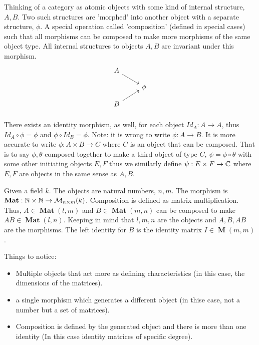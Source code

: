 \documentclass[12pt,a4paper]{report}
\newcommand{\CATSET}[1]{\operatorname{\textbf{#1}}}
\begin{document}
Thinking of a category as atomic objects with some kind of internal structure, $A,B$.  Two such structures are 'morphed' into another object with a separate structure, $\phi$.  A special operation called 'composition' (defined in special cases) such that all morphisms can be composed to make more morphisms of the same object type.  All internal structures to objects $A,B$ are invariant under this morphism.  
\[
	\begin{tikzcd}[row sep=small]
		A \arrow[rd]\\
		& \phi \\
		B \arrow[ru]\\
	\end{tikzcd}
\]There exists an identity morphism, as well, for each object $Id_A : A \to A$, thus $Id_A \circ \phi = \phi$ and $\phi \circ Id_B = \phi$.  Note: it is wrong to write $\phi : A \to B$.  It is more accurate to write $\phi : A \times B \to C$ where $C$ is an object that can be composed.  That is to say $\phi, \theta$ composed together to make a third object of type $C$, $\psi =\phi \circ \theta$ with some other initiating objects $E,F$ thus we similarly define $\psi: E \times F \to \mathbb{C}$ where $E,F$ are objects in the same sense as $A,B$.\\
\HLINE
\begin{example}

Given a field $k$.  The objects are natural numbers, $n,m$.  The morphism is $\CATSET{Mat}: \N \times \N \to \mathcal{M}_{n\times m}(k)$.  Composition is defined as matrix multiplication.  Thus, $A\in\CATSET{Mat}(l,m)$ and $B\in\CATSET{Mat}(m,n)$ can be composed to make $AB\in\CATSET{Mat}(l,n)$.  Keeping in mind that $l,m,n$ are the objects and $A,B, AB$ are the morphisms.  The left identity for $B$ is the identity matrix $I\in\CATSET{M}(m,m)$.

Things to notice:
\begin{itemize}
	\item Multiple objects that act more as defining characteristics (in this case, the dimensions of the matrices).
	\item a single morphism which generates a different object (in thise case, not a number but a set of matrices).
	\item Composition is defined by the generated object and there is more than one identity (In this case identity matrices of specific degree).
\end{itemize}

\end{example}
\end{document}
